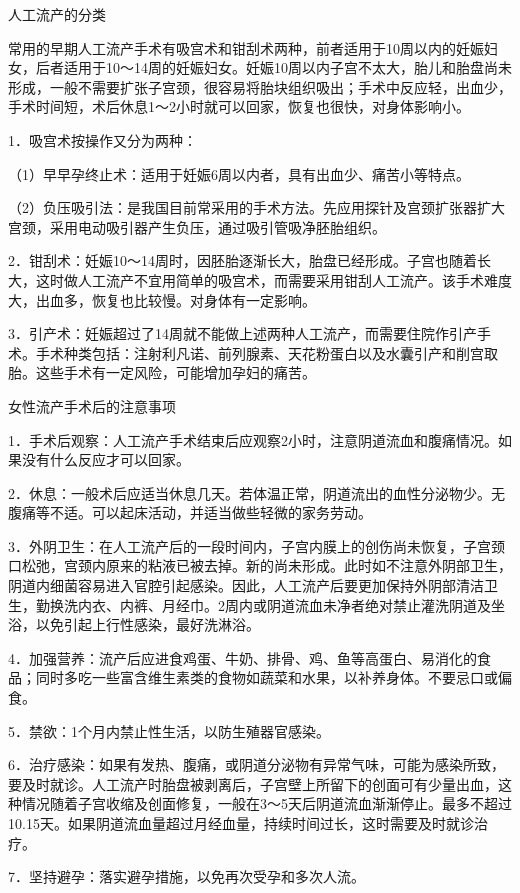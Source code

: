 \documentclass[12pt,UTF8]{ctexbook}
\begin{document}
人工流产的分类


常用的早期人工流产手术有吸宫术和钳刮术两种，前者适用于10周以内的妊娠妇女，后者适用于10～14周的妊娠妇女。妊娠10周以内子宫不太大，胎儿和胎盘尚未形成，一般不需要扩张子宫颈，很容易将胎块组织吸出；手术中反应轻，出血少，手术时间短，术后休息1～2小时就可以回家，恢复也很快，对身体影响小。

1．吸宫术按操作又分为两种：

（1）早早孕终止术：适用于妊娠6周以内者，具有出血少、痛苦小等特点。

（2）负压吸引法：是我国目前常采用的手术方法。先应用探针及宫颈扩张器扩大宫颈，采用电动吸引器产生负压，通过吸引管吸净胚胎组织。

2．钳刮术：妊娠10～14周时，因胚胎逐渐长大，胎盘已经形成。子宫也随着长大，这时做人工流产不宜用简单的吸宫术，而需要采用钳刮人工流产。该手术难度大，出血多，恢复也比较慢。对身体有一定影响。

3．引产术：妊娠超过了14周就不能做上述两种人工流产，而需要住院作引产手术。手术种类包括：注射利凡诺、前列腺素、天花粉蛋白以及水囊引产和削宫取胎。这些手术有一定风险，可能增加孕妇的痛苦。





女性流产手术后的注意事项


1．手术后观察：人工流产手术结束后应观察2小时，注意阴道流血和腹痛情况。如果没有什么反应才可以回家。

2．休息：一般术后应适当休息几天。若体温正常，阴道流出的血性分泌物少。无腹痛等不适。可以起床活动，并适当做些轻微的家务劳动。

3．外阴卫生：在人工流产后的一段时间内，子宫内膜上的创伤尚未恢复，子宫颈口松弛，宫颈内原来的粘液已被去掉。新的尚未形成。此时如不注意外阴部卫生，阴道内细菌容易进入官腔引起感染。因此，人工流产后要更加保持外阴部清洁卫生，勤换洗内衣、内裤、月经巾。2周内或阴道流血未净者绝对禁止灌洗阴道及坐浴，以免引起上行性感染，最好洗淋浴。

4．加强营养：流产后应进食鸡蛋、牛奶、排骨、鸡、鱼等高蛋白、易消化的食品；同时多吃一些富含维生素类的食物如蔬菜和水果，以补养身体。不要忌口或偏食。

5．禁欲：1个月内禁止性生活，以防生殖器官感染。

6．治疗感染：如果有发热、腹痛，或阴道分泌物有异常气味，可能为感染所致，要及时就诊。人工流产时胎盘被剥离后，子宫壁上所留下的创面可有少量出血，这种情况随着子宫收缩及创面修复，一般在3～5天后阴道流血渐渐停止。最多不超过10.15天。如果阴道流血量超过月经血量，持续时间过长，这时需要及时就诊治疗。

7．坚持避孕：落实避孕措施，以免再次受孕和多次人流。
\end{document}

